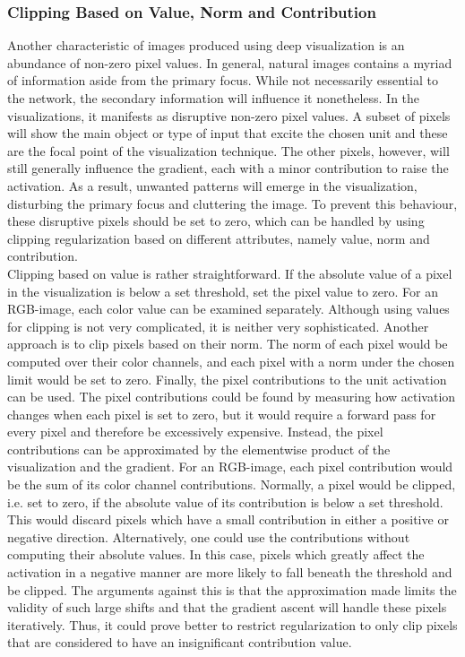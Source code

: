 \subsubsection{Clipping Based on Value, Norm and Contribution}

Another characteristic of images produced using deep visualization is an abundance of non-zero pixel values. In general, natural images contains a myriad of information aside from the primary focus. While not necessarily essential to the network, the secondary information will influence it nonetheless. In the visualizations, it manifests as disruptive non-zero pixel values. A subset of pixels will show the main object or type of input that excite the chosen unit and these are the focal point of the visualization technique. The other pixels, however, will still generally influence the gradient, each with a minor contribution to raise the activation. As a result, unwanted patterns will emerge in the visualization, disturbing the primary focus and cluttering the image. To prevent this behaviour, these disruptive pixels should be set to zero, which can be handled by using clipping regularization based on different attributes, namely value, norm and contribution. \\

\noindent Clipping based on value is rather straightforward. If the absolute value of a pixel in the visualization is below a set threshold, set the pixel value to zero. For an RGB-image, each color value can be examined separately. Although using values for clipping is not very complicated, it is neither very sophisticated. Another approach is to clip pixels based on their norm. The norm of each pixel would be computed over their color channels, and each pixel with a norm under the chosen limit would be set to zero. Finally, the pixel contributions to the unit activation can be used. The pixel contributions could be found by measuring how activation changes when each pixel is set to zero, but it would require a forward pass for every pixel and therefore be excessively expensive. Instead, the pixel contributions can be approximated by the elementwise product of the visualization and the gradient. For an RGB-image, each pixel contribution would be the sum of its color channel contributions. Normally, a pixel would be clipped, i.e. set to zero, if the absolute value of its contribution is below a set threshold. This would discard pixels which have a small contribution in either a positive or negative direction. Alternatively, one could use the contributions without computing their absolute values. In this case, pixels which greatly affect the activation in a negative manner are more likely to fall beneath the threshold and be clipped. The arguments against this is that the approximation made limits the validity of such large shifts and that the gradient ascent will handle these pixels iteratively. Thus, it could prove better to restrict regularization to only clip pixels that are considered to have an insignificant contribution value. 

